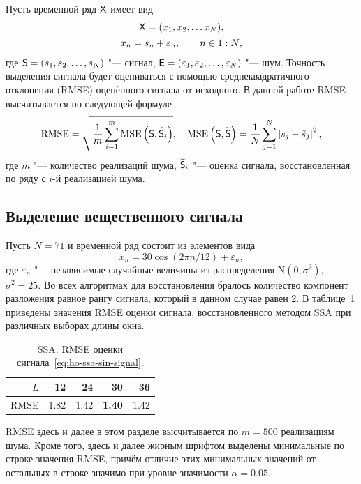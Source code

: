 \documentclass[specialist,
  substylefile=spbu_report.rtx,
subf,href,colorlinks=true, 12pt]{disser}
\theoremstyle{plain}
\theoremstyle{definition}
\theoremstyle{remark}
\begin{document}
Пусть временной ряд $\mathsf{X}$ имеет вид
\begin{gather*}
  \mathsf{X} = (x_1, x_2,\ldots x_{N}), \\
  x_n = s_n + \varepsilon_n, \qquad n\in \overline{1:N},
\end{gather*}
где $\mathsf{S} = (s_1, s_2, \ldots, s_N)$ "--- сигнал,
$\mathsf{E} = (\varepsilon_1, \varepsilon_2, \ldots, \varepsilon_N)$ "--- шум.
Точность выделения сигнала будет оцениваться с помощью среднеквадратичного отклонения (RMSE)
оценённого сигнала от исходного.
В данной работе RMSE высчитывается по следующей формуле
\begin{equation*}
  \text{RMSE} = \sqrt{\frac{1}{m} \sum_{i=1}^{m} \text{MSE}\left(\mathsf{S}, \widetilde{\mathsf{S}_i}\right)},
  \quad \text{MSE}\left(\mathsf{S}, \widetilde{\mathsf{S}} \right) = \frac{1}{N} \sum_{j=1}^{N}\left|s_j - \tilde{s}_j\right|^2,
\end{equation*}
где $m$ "--- количество реализаций шума, $\widetilde{\mathsf{S}}_i$ "--- оценка сигнала,
восстановленная по ряду с $i$-й реализацией шума.

\subsection{Выделение вещественного сигнала}\label{subsec:comparison}
Пусть $N = 71$ и временной ряд состоит из элементов вида
\begin{equation}
  \label{eq:ho-ssa-sin-signal}
  x_n = 30\cos(2\pi n/12) + \varepsilon_n,
\end{equation}
где $\varepsilon_n$ "--- независимые случайные величины из распределения $\mathrm{N}(0, \sigma^2)$,
$\sigma^2=25$.
Во всех алгоритмах для восстановления бралось количество компонент разложения равное рангу сигнала,
который в данном случае равен 2.
В таблице~\ref{tab:ssa-cos} приведены значения RMSE оценки сигнала, восстановленного
методом SSA при различных выборах длины окна.
\begin{table}[!ht]
  \centering
  \caption{SSA: RMSE оценки сигнала~\eqref{eq:ho-ssa-sin-signal}.}
  \begin{tabular}{r|r|r|r|r}
    \hline
    $L$ &   12 &   24 &            30 &   36 \\ \hline
    RMSE & 1.82 & 1.42 & \textbf{1.40} & 1.42 \\ \hline
  \end{tabular}\label{tab:ssa-cos}
\end{table}
RMSE здесь и далее в этом разделе высчитывается по $m=500$ реализациям шума.
Кроме того, здесь и далее жирным шрифтом выделены минимальные по строке значения RMSE, причём
отличие этих минимальных значений от остальных в строке значимо при уровне значимости $\alpha = 0.05$.
\end{document}
